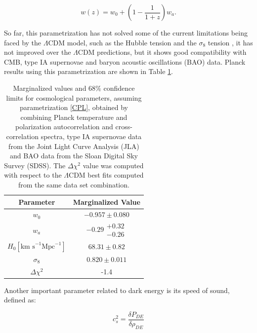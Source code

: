 \documentclass[openany,a4paper,12pt,oneside]{book}
\begin{document}
\begin{spacing}{1.5}
\begin{equation}\label{CPL}
    w(z)=w_0+\left(1-\frac{1}{1+z}\right)w_a.
\end{equation}


So far, this parametrization has not solved some of the current limitations being faced by the $\Lambda$CDM model, such as the Hubble tension \cite{Hubble_tension_review} and the $\sigma_8$ tension \cite{Planck_results}, it has not improved over the $\Lambda$CDM predictions, but it shows good compatibility with CMB, type IA supernovae and baryon acoustic oscillations (BAO) data\cite{Planck_results}. Planck results using this parametrization are shown in Table \ref{tab:planck_CPL}.

\begin{table}[!htb]
    \centering
    \begin{tabular}{cc} \hline
     Parameter & Marginalized Value \\ \hline
     $w_0$ & $-0.957\pm0.080$\\
     $w_a$ & $-0.29\substack{+0.32 \\ -0.26}$\\
     $H_0 [\text{km s}^{-1}\text{Mpc}^{-1}]$ & $68.31\pm0.82$ \\
     $\sigma_8$ & $0.820\pm 0.011$\\ \hline
     $\Delta \chi^2$ & -1.4 \\ \hline
    \end{tabular}
    \caption{Marginalized values and $68\%$ confidence limits for cosmological parameters, assuming parametrization \eqref{CPL}, obtained by combining Planck temperature and polarization autocorrelation and cross-correlation spectra\cite{Planck_spectra}, type IA supernovae data from the Joint Light Curve Analysis (JLA)\cite{JLA} and BAO data from the Sloan Digital Sky Survey (SDSS)\cite{SDSS}. The $\Delta \chi^2$ value was computed with respect to the $\Lambda$CDM best fits computed from the same data set combination.}
    \label{tab:planck_CPL}
\end{table}

Another important parameter related to dark energy is its speed of sound, defined as\cite{DE_sound}:

\begin{equation}\label{ch2:cs_definition}
	c_s^2=\frac{\delta P_{DE}}{\delta \rho_{DE}}
\end{equation}


\end{spacing}
\end{document}
